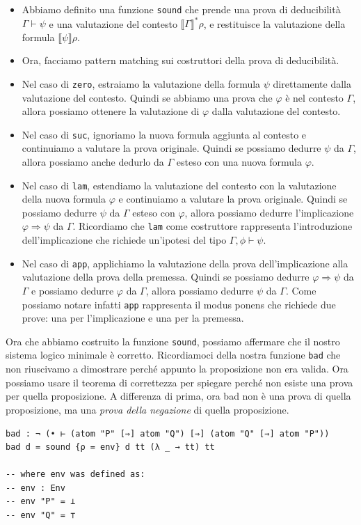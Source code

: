 \documentclass[a4paper]{article}
\theoremstyle{definition}
\theoremstyle{remark}
\begin{document}
\begin{itemize}
  \item Abbiamo definito una funzione \texttt{sound} che prende una prova di deducibilità \( Γ ⊢ ψ \) e una valutazione del contesto \( ⟦ Γ ⟧^* ρ \),
  e restituisce la valutazione della formula \( ⟦ ψ ⟧ ρ \).
  \item Ora, facciamo pattern matching sui costruttori della prova di deducibilità.
  \item Nel caso di \texttt{zero}, estraiamo la valutazione della formula \( ψ \) direttamente dalla valutazione del contesto. Quindi 
  se abbiamo una prova che \( φ \) è nel contesto \( Γ \), allora possiamo ottenere la valutazione di \( φ \) dalla valutazione del contesto.
  \item Nel caso di \texttt{suc}, ignoriamo la nuova formula aggiunta al contesto e continuiamo a valutare la prova originale. Quindi se possiamo dedurre \( ψ \) da \( Γ \), allora possiamo anche dedurlo da \( Γ \) esteso con una nuova formula \( φ \).
  \item Nel caso di \texttt{lam}, estendiamo la valutazione del contesto con la valutazione della nuova formula \( φ \) e continuiamo a valutare la prova originale. Quindi se possiamo dedurre \( ψ \) da \( Γ \) esteso con \( φ \), allora possiamo dedurre l'implicazione \( φ ⇒ ψ \) da \( Γ \).
  Ricordiamo che \texttt{lam} come costruttore rappresenta l'introduzione dell'implicazione che richiede un'ipotesi del tipo \( \Gamma, \phi \vdash \psi \).
  \item Nel caso di \texttt{app}, applichiamo la valutazione della prova dell'implicazione alla valutazione della prova della premessa. Quindi se possiamo dedurre \( φ ⇒ ψ \) da \( Γ \) e possiamo dedurre \( φ \) da \( Γ \), allora possiamo dedurre \( ψ \) da \( Γ \).
  Come possiamo notare infatti \texttt{app} rappresenta il modus ponens che richiede due prove: una per l'implicazione e una per la premessa.
\end{itemize}
Ora che abbiamo costruito la funzione \texttt{sound}, possiamo affermare che il nostro sistema logico minimale è corretto.
Ricordiamoci della nostra funzione \texttt{bad} che non riuscivamo a dimostrare perché appunto 
la proposizione non era valida. Ora possiamo usare il teorema di correttezza per spiegare perché non esiste una prova per quella proposizione.
A differenza di prima, ora bad non è una prova di quella proposizione, 
ma una \textit{prova della negazione} di quella proposizione.
\begin{verbatim}
bad : ¬ (• ⊢ (atom "P" [⇒] atom "Q") [⇒] (atom "Q" [⇒] atom "P"))
bad d = sound {ρ = env} d tt (λ _ → tt) tt

-- where env was defined as:
-- env : Env
-- env "P" = ⊥
-- env "Q" = ⊤
\end{verbatim}
\end{document}
